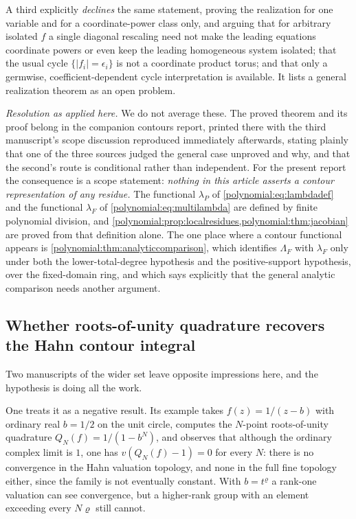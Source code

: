 \documentclass[11pt,letterpaper]{article}
\numberwithin{equation}{section}
\theoremstyle{definition}
\theoremstyle{remark}\newtheorem{remark}[theorem]{Remark}
\begin{document}
A third explicitly \emph{declines} the same statement, proving the realization
for one variable and for a coordinate-power class only, and arguing that for
arbitrary isolated $f$ a single diagonal rescaling need not make the leading
equations coordinate powers or even keep the leading homogeneous system
isolated; that the usual cycle $\{|f_i|=\epsilon_i\}$ is not a coordinate
product torus; and that only a germwise, coefficient-dependent cycle
interpretation is available. It lists a general realization theorem as an open
problem.

\emph{Resolution as applied here.} We do not average these. The proved
theorem and its proof belong in the companion contours report, printed there
with the third manuscript's scope discussion reproduced immediately
afterwards, stating plainly that one of the three sources judged the general
case unproved and why, and that the second's route is conditional rather than
independent. For the present report the consequence is a scope statement:
\emph{nothing in this article asserts a contour representation of any residue.}
The functional $\lambda_P$ of \eqref{polynomial:eq:lambdadef} and the
functional $\lambda_F$ of \eqref{polynomial:eq:multilambda} are defined by
finite polynomial division, and
\cref{polynomial:prop:localresidues,polynomial:thm:jacobian} are proved from
that definition alone. The one place where a contour functional appears is
\cref{polynomial:thm:analyticcomparison}, which identifies $\Lambda_F$ with
$\lambda_F$ only under both the lower-total-degree hypothesis and the
positive-support hypothesis, over the fixed-domain ring, and which says
explicitly that the general analytic comparison needs another argument.

\subsection{Whether roots-of-unity quadrature recovers the Hahn contour
integral}
Two manuscripts of the wider set leave opposite impressions here, and the
hypothesis is doing all the work.

One treats it as a negative result. Its example takes $f(z)=1/(z-b)$ with
ordinary real $b=1/2$ on the unit circle, computes the $N$-point
roots-of-unity quadrature $Q_N(f)=1/(1-b^N)$, and observes that although the
ordinary complex limit is $1$, one has $v(Q_N(f)-1)=0$ for every $N$: there is
no convergence in the Hahn valuation topology, and none in the full fine
topology either, since the family is not eventually constant. With $b=t^\varrho$
a rank-one valuation can see convergence, but a higher-rank group with an
element exceeding every $N\varrho$ still cannot.
\end{document}
